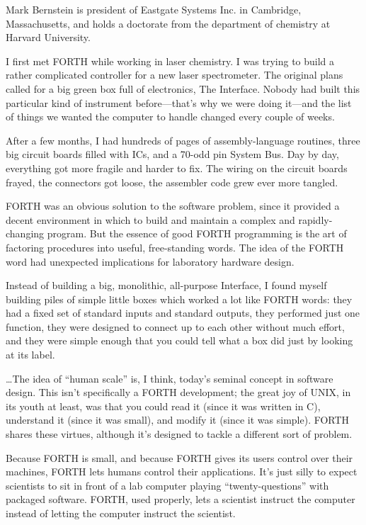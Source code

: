 \begin{interview}
Mark Bernstein is president of Eastgate Systems Inc. in Cambridge, 
Massachusetts, and holds a doctorate from the department of 
chemistry at Harvard University.

\begin{tfquot}
I first met FORTH while working in laser chemistry.  I was trying to build a
rather complicated controller for a new laser spectrometer.  The original
plans called for a big green box full of electronics, The Interface.  Nobody 
had built this particular kind of instrument before---that's why we were 
doing it---and the list of things we wanted the computer to handle changed
every couple of weeks.

After a few months, I had hundreds of pages of assembly-language 
routines, three big circuit boards filled with ICs, and a 70-odd pin System
Bus.  Day by day, everything got more fragile and harder to fix.  The wiring 
on the circuit boards frayed, the connectors got loose, the assembler code
grew ever more tangled.

FORTH was an obvious solution to the software problem, since it provided
a decent environment in which to build and maintain a complex and
rapidly-changing program.  But the essence of good FORTH programming is the 
art of factoring procedures into useful, free-standing words.  The idea of the
FORTH word had unexpected implications for laboratory hardware design.

Instead of building a big, monolithic, all-purpose Interface, I found myself
building piles of simple little boxes which worked a lot like FORTH words:
they had a fixed set of standard inputs and standard outputs, they performed
just one function, they were designed to connect up to each other 
without much effort, and they were simple enough that you could tell what 
a box did just by looking at its label.

\ldots The idea of ``human scale'' is, I think, today's seminal concept in 
software design.  This isn't specifically a FORTH development; the great joy of
UNIX, in its youth at least, was that you could read it (since it was written
in C), understand it (since it was small), and modify it (since it was simple).
FORTH shares these virtues, although it's designed to tackle a different 
sort of problem.

Because FORTH is small, and because FORTH gives its users control over
their machines, FORTH lets humans control their applications.  It's just
silly to expect scientists to sit in front of a lab computer playing
``twenty-questions'' with packaged software.  FORTH, used properly, lets a scientist
instruct the computer instead of letting the computer instruct the scientist.


\end{tfquot}
\end{interview}

